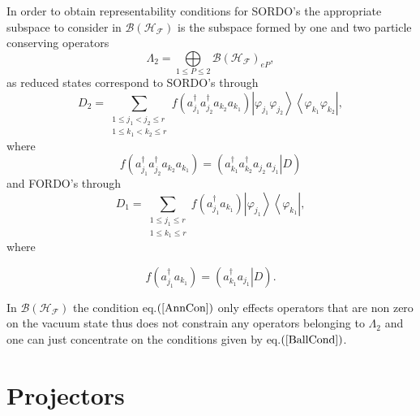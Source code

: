 \documentclass[aps,preprint]{revtex4}%
\begin{document}
In order to obtain representability conditions for SORDO's the appropriate
subspace to consider in $\mathcal{B}\left(  \mathcal{H}_{\mathcal{F}}\right)
$ is the subspace formed by one and two particle conserving operators
\begin{equation}
\Lambda_{2}=%
{\displaystyle\bigoplus\limits_{1\leq P\leq2}}
\mathcal{B}\left(  \mathcal{H}_{\mathcal{F}}\right)  _{eP},
\end{equation}
as reduced states correspond to SORDO's through%
\begin{equation}
D_{2}=\sum_{\substack{1\leq j_{1}<j_{2}\leq r\\1\leq k_{1}<k_{2}\leq
r}}f\left(  a_{j_{1}}^{\dagger}a_{j_{2}}^{\dagger}a_{k_{2}}a_{k_{1}}\right)
\left\vert \varphi_{j_{1}}\varphi_{j_{2}}\right\rangle \left\langle
\varphi_{k_{1}}\varphi_{k_{2}}\right\vert ,
\end{equation}
where%
\begin{equation}
f\left(  a_{j_{1}}^{\dagger}a_{j_{2}}^{\dagger}a_{k_{2}}a_{k_{1}}\right)
=\left(  \left.  a_{k_{1}}^{\dagger}a_{k_{2}}^{\dagger}a_{j_{2}}a_{j_{1}%
}\right\vert D\right)
\end{equation}
and FORDO's through
\begin{equation}
D_{1}=\sum_{\substack{1\leq j_{1}\leq r\\1\leq k_{1}\leq r}}f\left(  a_{j_{1}%
}^{\dagger}a_{k_{1}}\right)  \left\vert \varphi_{j_{1}}\right\rangle
\left\langle \varphi_{k_{1}}\right\vert ,
\end{equation}
where%

\begin{equation}
f\left(  a_{j_{1}}^{\dagger}a_{k_{1}}\right)  =\left(  \left.  a_{k_{1}%
}^{\dagger}a_{j_{1}}\right\vert D\right)  .
\end{equation}


In $\mathcal{B}\left(  \mathcal{H}_{\mathcal{F}}\right)  $ the condition
eq.$\left(  \ref{AnnCon}\right)  $ only effects operators that are non zero on
the vacuum state thus does not constrain any operators belonging to
$\Lambda_{2}$ and one can just concentrate on the conditions given by
eq.$\left(  \ref{BallCond}\right)  $.

\section{Projectors \label{Projectors}}
\end{document}
